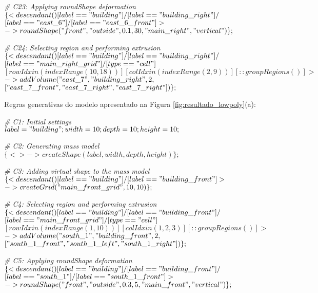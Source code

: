 \noindent \textit{\# C23: Applying roundShape deformation}\\
$\{< descendant() [label=="building"] / [label=="building\_right"] / $\\
$[label=="east\_6"] / [label=="east\_6\_front"] > $\\
$-> roundShape("front", "outside", 0.1, 30, "main\_right", "vertical")\};$

\noindent \textit{\# C24: Selecting region and performing extrusion}\\
$\{< descendant() [label=="building"] / [label=="building\_right"] / $\\
$[label=="main\_right\_grid"] / [type=="cell"] $\\
$[rowIdx in (indexRange(10, 18))] [colIdx in (indexRange(2, 9))] [::groupRegions()] > $\\
$-> addVolume("east\_7", "building\_right", 2, $ \\
$["east\_7\_front", "east\_7\_right", "east\_7\_right"])\};$

\vspace{1cm}

Regras generativas do modelo apresentado na Figura \ref{fig:resultado_lowpoly}(a):

\noindent \textit{\# C1: Initial settings}\\
$label = "building"; width = 10; depth = 10; height = 10;$

\noindent \textit{\# C2: Generating mass model}\\
$\{<> -> createShape(label, width, depth, height)\};$

\noindent \textit{\# C3: Adding virtual shape to the mass model}\\
$\{< descendant() [label=="building"] / [label=="building\_front"] > $\\
$-> createGrid("main\_front\_grid", 10, 10)\};$

\noindent \textit{\# C4: Selecting region and performing extrusion}\\
$\{< descendant() [label=="building"] / [label=="building\_front"] / $\\
$[label=="main\_front\_grid"] / [type=="cell"] $\\
$[rowIdx in (indexRange(1, 10))] [colIdx in (1, 2, 3)] [::groupRegions()] > $\\
$-> addVolume("south\_1", "building\_front", 2, $\\
$["south\_1\_front", "south\_1\_left", "south\_1\_right"])\};$

\noindent \textit{\# C5: Applying roundShape deformation}\\
$\{< descendant() [label=="building"] / [label=="building\_front"] / $\\
$[label=="south\_1"] / [label=="south\_1\_front"] > $\\
$-> roundShape("front", "outside", 0.3, 5, "main\_front", "vertical")\};$

